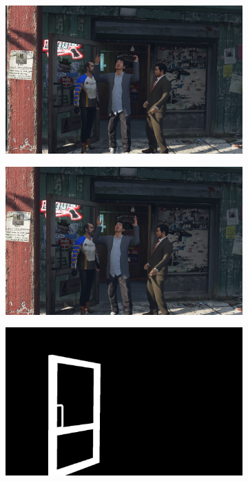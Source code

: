 \begin{figure}
\centering
\begin{subfigure}[t]{0.19\textwidth}
\centering
\includegraphics[scale=0.07]{good_examples/visual_74577_img.png}
\end{subfigure}
\begin{subfigure}[t]{0.19\textwidth}
\centering
\includegraphics[scale=0.07]{good_examples/visual_74577_img1.png}
\end{subfigure}
\begin{subfigure}[t]{0.19\textwidth}
\centering
\includegraphics[scale=0.07]{good_examples/visual_74577_gt.png}

\end{subfigure}
\end{figure}
